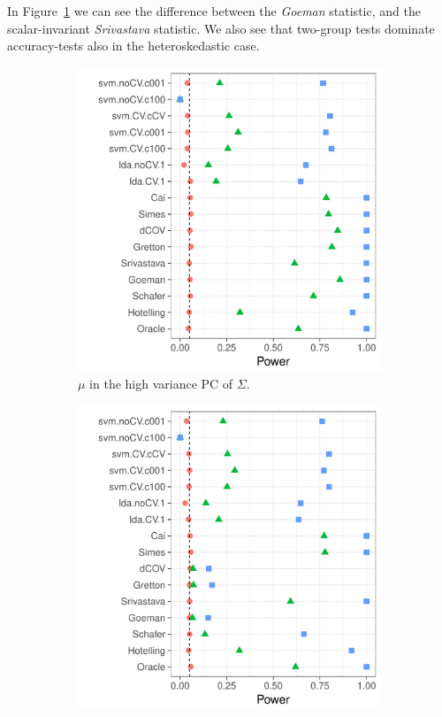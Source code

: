 \documentclass[]{bio}
\begin{document}
In Figure~\ref{fig:heteroskedastic_11} we can see the difference between the \emph{Goeman} statistic, and the scalar-invariant \emph{Srivastava} statistic. 
We also see that two-group tests dominate accuracy-tests also in the heteroskedastic case. 

\begin{figure}[h]
	\centering
	\begin{subfigure}[t]{.45\columnwidth}
		\centering
		\includegraphics[width=1\columnwidth]{"art/file26"}
		\caption{$\mu$ in the high variance PC of $\Sigma$.}  
		\label{fig:heteroskedastic_11}	
	\end{subfigure}
	\begin{subfigure}[t]{0.45\columnwidth}
		\centering
		\includegraphics[width=1\columnwidth]{"art/file24"}

\end{subfigure}
\end{figure}
\end{document}
